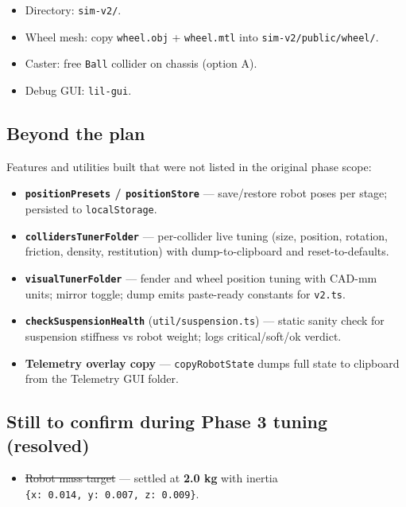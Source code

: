 \documentclass[
]{article}
\providecommand{\tightlist}{%
  \setlength{\itemsep}{0pt}\setlength{\parskip}{0pt}}
\begin{document}
\begin{itemize}
\tightlist
\item
  Directory: \texttt{sim-v2/}.
\item
  Wheel mesh: copy \texttt{wheel.obj} + \texttt{wheel.mtl} into
  \texttt{sim-v2/public/wheel/}.
\item
  Caster: free \texttt{Ball} collider on chassis (option A).
\item
  Debug GUI: \texttt{lil-gui}.
\end{itemize}

\subsection{Beyond the plan}\label{beyond-the-plan}

Features and utilities built that were not listed in the original phase
scope:

\begin{itemize}
\tightlist
\item
  \textbf{\texttt{positionPresets} / \texttt{positionStore}} ---
  save/restore robot poses per stage; persisted to
  \texttt{localStorage}.
\item
  \textbf{\texttt{collidersTunerFolder}} --- per-collider live tuning
  (size, position, rotation, friction, density, restitution) with
  dump-to-clipboard and reset-to-defaults.
\item
  \textbf{\texttt{visualTunerFolder}} --- fender and wheel position
  tuning with CAD-mm units; mirror toggle; dump emits paste-ready
  constants for \texttt{v2.ts}.
\item
  \textbf{\texttt{checkSuspensionHealth}} (\texttt{util/suspension.ts})
  --- static sanity check for suspension stiffness vs robot weight; logs
  critical/soft/ok verdict.
\item
  \textbf{Telemetry overlay copy} --- \texttt{copyRobotState} dumps full
  state to clipboard from the Telemetry GUI folder.
\end{itemize}

\subsection{Still to confirm during Phase 3 tuning
(resolved)}\label{still-to-confirm-during-phase-3-tuning-resolved}

\begin{itemize}
\tightlist
\item
  \st{Robot mass target} --- settled at \textbf{2.0 kg} with inertia
  \texttt{\{x:\ 0.014,\ y:\ 0.007,\ z:\ 0.009\}}.
\end{itemize}
\end{document}
